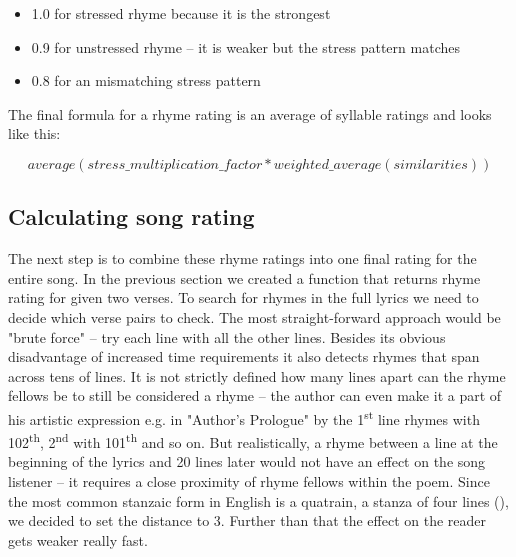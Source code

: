 \begin{itemize}
	\item 1.0 for stressed rhyme because it is the strongest
	
	\item 0.9 for unstressed rhyme -- it is weaker but the stress pattern matches
	
	\item 0.8 for an mismatching stress pattern
\end{itemize}


The final formula for a rhyme rating is an average of syllable ratings and looks like this:

\[average(stress\_multiplication\_factor*weighted\_average(similarities))\]


\subsection{Calculating song rating}

The next step is to combine these rhyme ratings into one final rating for the entire song. In the previous section we created a function that returns rhyme rating for given two verses. To search for rhymes in the full lyrics we need to decide which verse pairs to check. The most straight-forward approach would be "brute force" -- try each line with all the other lines. Besides its obvious disadvantage of increased time requirements it also detects rhymes that span across tens of lines. It is not strictly defined how many lines apart can the rhyme fellows be to still be considered a rhyme -- the author can even make it a part of his artistic expression  e.g. in "Author's Prologue" by \cite{thomas1952author} the 1\textsuperscript{st} line rhymes with 102\textsuperscript{th}, 2\textsuperscript{nd} with 101\textsuperscript{th} and so on. But realistically, a rhyme between a line at the beginning of the lyrics and 20 lines later would not have an effect on the song listener -- it requires a close proximity of rhyme fellows within the poem. Since the most common stanzaic form in English is a quatrain, a stanza of four lines (\cite{eastman1970norton}), we decided to set the distance to 3. Further than that the effect on the reader gets weaker really fast. 

